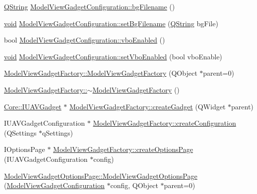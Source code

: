 \begin{DoxyCompactItemize}
\item 
\hyperlink{group___u_a_v_objects_plugin_gab9d252f49c333c94a72f97ce3105a32d}{\-Q\-String} \hyperlink{group___model_view_plugin_ga1d269e09831fb3fd6187c831b3b516b1}{\-Model\-View\-Gadget\-Configuration\-::bg\-Filename} ()
\item 
\hyperlink{group___u_a_v_objects_plugin_ga444cf2ff3f0ecbe028adce838d373f5c}{void} \hyperlink{group___model_view_plugin_gac9bccdbb077005f2bb94cfc7c9dfefaa}{\-Model\-View\-Gadget\-Configuration\-::set\-Bg\-Filename} (\hyperlink{group___u_a_v_objects_plugin_gab9d252f49c333c94a72f97ce3105a32d}{\-Q\-String} bg\-File)
\item 
bool \hyperlink{group___model_view_plugin_ga82f3e4d2137def4ff8aa56abc69d3bce}{\-Model\-View\-Gadget\-Configuration\-::vbo\-Enabled} ()
\item 
\hyperlink{group___u_a_v_objects_plugin_ga444cf2ff3f0ecbe028adce838d373f5c}{void} \hyperlink{group___model_view_plugin_gad35eb4d4a2a27f015e4e54b18e3b2b97}{\-Model\-View\-Gadget\-Configuration\-::set\-Vbo\-Enabled} (bool vbo\-Enable)
\item 
\hyperlink{group___model_view_plugin_gab4ca362258332f3214c66cc63ba54d77}{\-Model\-View\-Gadget\-Factory\-::\-Model\-View\-Gadget\-Factory} (\-Q\-Object $\ast$parent=0)
\item 
\hyperlink{group___model_view_plugin_ga7bdf383eb25b1a5226f036371be723b5}{\-Model\-View\-Gadget\-Factory\-::$\sim$\-Model\-View\-Gadget\-Factory} ()
\item 
\hyperlink{class_core_1_1_i_u_a_v_gadget}{\-Core\-::\-I\-U\-A\-V\-Gadget} $\ast$ \hyperlink{group___model_view_plugin_ga10c8c524e828527192c4821b769ab1fe}{\-Model\-View\-Gadget\-Factory\-::create\-Gadget} (\-Q\-Widget $\ast$parent)
\item 
\-I\-U\-A\-V\-Gadget\-Configuration $\ast$ \hyperlink{group___model_view_plugin_gaa2d13e8c20201017fc03b9ffd781247c}{\-Model\-View\-Gadget\-Factory\-::create\-Configuration} (\-Q\-Settings $\ast$q\-Settings)
\item 
\-I\-Options\-Page $\ast$ \hyperlink{group___model_view_plugin_gacccb2300c14739970fbef9a38365c070}{\-Model\-View\-Gadget\-Factory\-::create\-Options\-Page} (\-I\-U\-A\-V\-Gadget\-Configuration $\ast$config)
\item 
\hyperlink{group___model_view_plugin_ga86839ae520e5a8d7d38e0349ab8110db}{\-Model\-View\-Gadget\-Options\-Page\-::\-Model\-View\-Gadget\-Options\-Page} (\hyperlink{class_model_view_gadget_configuration}{\-Model\-View\-Gadget\-Configuration} $\ast$config, \-Q\-Object $\ast$parent=0)

\end{DoxyCompactItemize}
